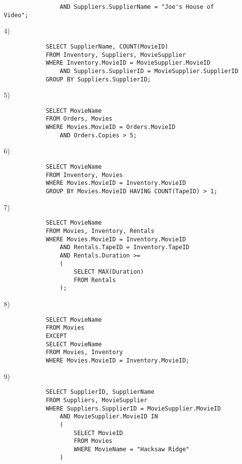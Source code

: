 \documentclass[10pt,a4paper]{article}
\begin{document}
\begin{enumerate}
\begin{verbatim}
                AND Suppliers.SupplierName = "Joe's House of Video";
        \end{verbatim}
        \item[4)]\begin{verbatim}
            SELECT SupplierName, COUNT(MovieID)
            FROM Inventory, Suppliers, MovieSupplier
            WHERE Inventory.MovieID = MovieSupplier.MovieID
                AND Suppliers.SupplierID = MovieSupplier.SupplierID
            GROUP BY Suppliers.SupplierID;
        \end{verbatim}
        \item[5)]\begin{verbatim}
            SELECT MovieName
            FROM Orders, Movies
            WHERE Movies.MovieID = Orders.MovieID
                AND Orders.Copies > 5;
        \end{verbatim}
        \item[6)]\begin{verbatim}
            SELECT MovieName
            FROM Inventory, Movies
            WHERE Movies.MovieID = Inventory.MovieID
            GROUP BY Movies.MovieID HAVING COUNT(TapeID) > 1;
        \end{verbatim}
        \item[7)]\begin{verbatim}
            SELECT MovieName
            FROM Movies, Inventory, Rentals
            WHERE Movies.MovieID = Inventory.MovieID
                AND Rentals.TapeID = Inventory.TapeID
                AND Rentals.Duration >= 
                (
                    SELECT MAX(Duration)
                    FROM Rentals
                );
        \end{verbatim}
        \item[8)]\begin{verbatim}
            SELECT MovieName
            FROM Movies
            EXCEPT
            SELECT MovieName
            FROM Movies, Inventory
            WHERE Movies.MovieID = Inventory.MovieID;
        \end{verbatim}
        \item[9)]\begin{verbatim}
            SELECT SupplierID, SupplierName
            FROM Suppliers, MovieSupplier
            WHERE Suppliers.SupplierID = MovieSupplier.MovieID
                AND MovieSupplier.MovieID IN
                (
                    SELECT MovieID
                    FROM Movies
                    WHERE MovieName = "Hacksaw Ridge"
                )

\end{verbatim}
\end{enumerate}
\end{document}
